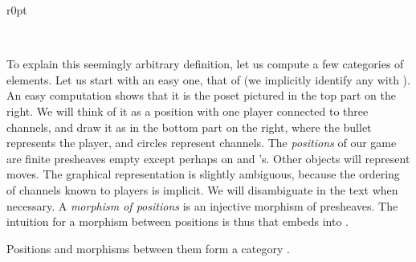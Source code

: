 \documentclass{LMCS}
\theoremstyle{plain}\newtheorem{satz}[thm]{Satz}
\begin{document}
\begin{wrapfigure}{r}{0pt}
  \begin{minipage}[t]{0.3\linewidth}
    \centering
    \\
  \end{minipage}
\end{wrapfigure}
To explain this seemingly arbitrary definition, let us compute a few
categories of elements. Let us start with an easy one, that of  (we implicitly identify any  with ). An
easy computation shows that it is the poset pictured in the top part
on the right. We will think of it as a position with one player
 connected to three channels, and draw it as in the
bottom part on the right, where the bullet represents the player, and
circles represent channels.  The \emph{positions} of our game are
finite presheaves empty except perhaps on  and 's. Other
objects will represent moves.  The graphical representation is
slightly ambiguous, because the ordering of channels known to players
is implicit.  We will disambiguate in the text when necessary.  A
\emph{morphism of positions} is an injective morphism of presheaves.
The intuition for a morphism  between positions is thus that
 embeds into .
\begin{defi}\label{def:Dh}
  Positions and morphisms between them form a category .
\end{defi}
\end{document}
